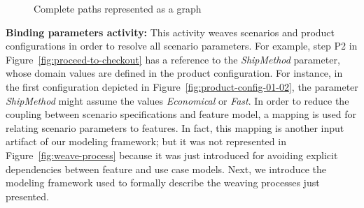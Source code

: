 \documentclass[11pt]{report}
\begin{document}
 
\begin{figure}[bth]
\begin{center}
\begin{tiny}
\begin{xy}
\end{xy}
\end{tiny}
 \caption{Complete paths represented  as a graph}
\label{fig:complete-paths}
\end{center}
\end{figure}

{\bf Binding parameters activity:}  This activity weaves scenarios and product configurations in order to resolve all scenario parameters. 
For example, step P2 in Figure~\ref{fig:proceed-to-checkout} has a reference 
 to the \emph{ShipMethod} parameter, whose domain values are defined in the product configuration. For instance, in the first configuration depicted in Figure~\ref{fig:product-config-01-02}, the parameter \emph{ShipMethod} might assume the values \emph{Economical} or \emph{Fast}. 
In order to reduce the coupling between scenario specifications and feature model, a mapping is used for relating scenario parameters to features. In fact, this mapping is another input artifact of our modeling framework; but it was not represented in Figure~\ref{fig:weave-process} because it was just introduced for avoiding explicit dependencies between feature and use case models.  
Next, we introduce the modeling framework used to formally describe the weaving processes just presented. 
\end{document}
